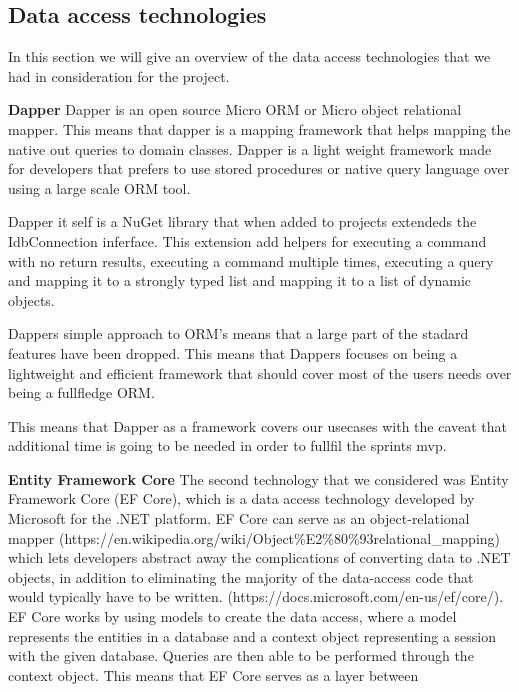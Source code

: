 \subsection{Data access technologies}
In this section we will give an overview of the data access technologies that we had in consideration for the project.


\textbf{Dapper}
Dapper is an open source Micro ORM or Micro object relational mapper. This means that dapper is a mapping framework that helps mapping the native out queries to domain classes. Dapper is a light weight framework made for developers that prefers to use stored procedures or native query language over using a large scale ORM tool. 

Dapper it self is a NuGet library that when added to projects extendeds the IdbConnection inferface. This extension add helpers for executing a command with no return results, executing a command multiple times, executing a query and mapping it to a strongly typed list and mapping it to a list of dynamic objects. \cite{Dapper_Git}

Dappers simple approach to ORM's means that a large part of the stadard features have been dropped. This means that Dappers focuses on being a lightweight and efficient framework that should cover most of the users needs over being a fullfledge ORM.\cite{Dapper_Git} 

This means that Dapper as a framework covers our usecases with the caveat that additional time is going to be needed in order to fullfil the sprints mvp. 

\textbf{Entity Framework Core}
The second technology that we considered was Entity Framework Core (EF Core), which is a data access technology developed by Microsoft for the .NET platform. EF Core can serve as an object-relational mapper (https://en.wikipedia.org/wiki/Object\%E2\%80\%93relational_mapping) which lets developers abstract away the complications of converting data to .NET objects, in addition to eliminating the majority of the data-access code that would typically have to be written. (https://docs.microsoft.com/en-us/ef/core/).
EF Core works by using models to create the data access, where a model represents the entities in a database and a context object representing a session with the given database. Queries are then able to be performed through the context object. 
This means that EF Core serves as a layer between 


